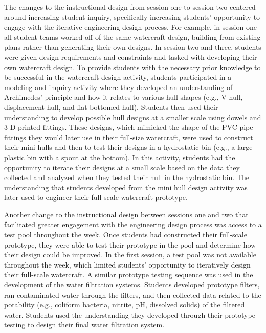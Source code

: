 \documentclass[11.5pt]{sig-alternate} %
\begin{document}
\begin{large}
The changes to the instructional design from session one to session two centered around increasing student inquiry, specifically increasing students’ opportunity to engage with the iterative engineering design process. For example, in session one all student teams worked off of the same watercraft design, building from existing plans rather than generating their own designs. In session two and three, students were given design requirements and constraints and tasked with developing their own watercraft design. To provide students with the necessary prior knowledge to be successful in the watercraft design activity, students participated in a modeling and inquiry activity where they developed an understanding of Archimedes’ principle and how it relates to various hull shapes (e.g., V-hull, displacement hull, and flat-bottomed hull). Students then used their understanding to develop possible hull designs at a smaller scale using dowels and 3-D printed fittings. These designs, which mimicked the shape of the PVC pipe fittings they would later use in their full-size watercraft, were used to construct their mini hulls and then to test their designs in a hydrostatic bin (e.g., a large plastic bin with a spout at the bottom). In this activity, students had the opportunity to iterate their designs at a small scale based on the data they collected and analyzed when they tested their hull in the hydrostatic bin. The understanding that students developed from the mini hull design activity was later used to engineer their full-scale watercraft prototype. 

Another change to the instructional design between sessions one and two that facilitated greater engagement with the engineering design process was access to a test pool throughout the week. Once students had constructed their full-scale prototype, they were able to test their prototype in the pool and determine how their design could be improved. In the first session, a test pool was not available throughout the week, which limited students’ opportunity to iteratively design their full-scale watercraft. A similar prototype testing sequence was used in the development of the water filtration systems. Students developed prototype filters, ran contaminated water through the filters, and then collected data related to the potability (e.g., coliform bacteria, nitrite, pH, dissolved solids) of the filtered water. Students used the understanding they developed through their prototype testing to design their final water filtration system. 


\end{large}
\end{document}
